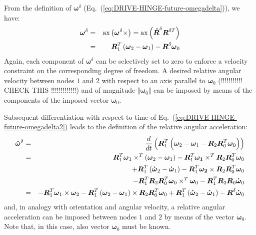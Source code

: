 \documentclass[10pt,dvips,fleqn]{report}
\newcommand{\T}[1]{\boldsymbol{#1}}
\begin{document}
From the definition of $\T{\omega}^{\delta}$ (Eq.~(\ref{eq:DRIVE-HINGE-future-omegadelta})), we have:
\begin{eqnarray}
\nonumber \T{\omega}^{\delta} 
	&=& 	\llk{ax}\plbr{\T{\omega}^{\delta}\times} = 		\llk{ax}\plbr{\T{\dot{R}}^{\delta}\T{R}^{\delta T}}\\
	&=&	\T{R}_1^T\plbr{\T{\omega}_2 - \T{\omega}_1} - \T{R}^{\delta}\T{\omega}_0
	\label{eq:DRIVE-HINGE-future-omegadelta2}
\end{eqnarray} 
Again, each component of $\T{\omega}^{\delta}$ can be selectively set
to zero to enforce a velocity constraint on the corresponding degree of freedom.
A desired relative angular velocity between nodes $1$ and $2$ with respect to an axis parallel to $\T{\omega}_0$ (!!!!!!!!!!! CHECK THIS !!!!!!!!!!!!!) and of magnitude $\Vert\T{\omega}_0\Vert$ can be imposed
by means of the components of the imposed vector $\T{\omega}_0$.

\noindent
Subsequent differentiation with respect to time of Eq.~(\ref{eq:DRIVE-HINGE-future-omegadelta2}) leads to the definition of the relative angular acceleration:
\begin{eqnarray*}
\T{\dot{\omega}}^{\delta} 
	&=&
	\dfrac{d}{dt}\plbr{\T{R}_1^T\plbr{\T{\omega}_2-
	\T{\omega}_1-\T{R}_2\T{R}_0^T\T{\omega}_0}}\\
	&=&
	\T{R}_1^T\T{\omega}_1\times^T\plbr{\T{\omega}_2-\T{\omega}_1} -
	\T{R}_1^T\T{\omega_1}\times^T\T{R}_2\T{R}_0^T\T{\omega}_0\\ 
	&&+\T{R}_1^T\plbr{\T{\dot{\omega}}_2-\T{\dot{\omega}}_1} -
	\T{R}_1^T\T{\omega_2}\times\T{R}_2\T{R}_0^T\T{\omega}_0\\
	&&-\T{R}_1^T\T{R}_2\T{R}_0^T\T{\omega}_0\times^T\T{\omega}_0 -
	\T{R}_1^T\T{R}_2\T{R}_0\T{\dot{\omega}}_0 \\
	&=&
	-\T{R}_1^T\T{\omega}_1\times\T{\omega}_2
	-\T{R}_1^T\plbr{\T{\omega}_2-\T{\omega}_1}\times\T{R}_2\T{R}_0^T\T{\omega}_0
	+\T{R}_1^T\plbr{\T{\dot{\omega}}_2-\T{\dot{\omega}}_1}
	-\T{R}^{\delta}\T{\dot{\omega}}_0	
\end{eqnarray*}
and, in analogy with orientation and angular velocity, a relative angular acceleration can be imposed between nodes $1$ and $2$ by means of the vector $\T{\dot{\omega}}_0$. Note that, in this case, also vector $\T{\omega}_0$ must be known.
\end{document}
